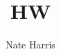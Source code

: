\documentclass{article}
\title{HW }
\author{Nate Harris}
\begin{document}
\maketitle{}
\section{}
\section{}
\section{}
\end{document}
